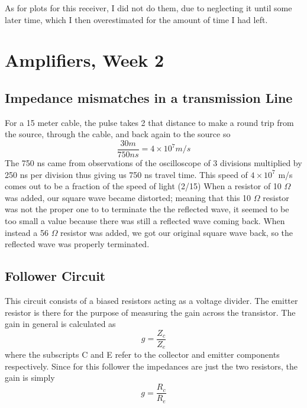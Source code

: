 \documentclass[12 pt]{article}
\begin{document}
As for plots for this receiver, I did not do them, due to neglecting it
until some later time, which I then overestimated for the amount of time I
had left.


\section{Amplifiers, Week 2}

\subsection{Impedance mismatches in a transmission Line}
For a 15 meter cable, the pulse takes 2 that distance to make a round
trip from the source, through the cable, and back again to the source so 
\begin{equation}
  \label{pulse velocity}
  \frac{30 m}{750 ns} = 4\times10^{7} m/s
\end{equation}
The 750 ns came from observations of the oscilloscope of 3 divisions
multiplied by 250 ns per division thus giving us 750 ns travel
time. This speed of $4\times10^{7}$ m/s comes out to be a fraction of
the speed of light (2/15) 
When a resistor of 10 $\Omega$ was added, our square wave became
distorted; meaning that this 10 $\Omega$ resistor was not the proper one
to to terminate the the reflected wave, it seemed to be too small a
value because there was still a reflected wave coming back.
When instead a 56 $\Omega$ resistor was added, we got our original
square wave back, so the reflected wave was properly terminated. 

\subsection{Follower Circuit}
This circuit consists of a biased resistors acting as a voltage
divider. The emitter resistor is there for the purpose of measuring the
gain across the transistor. The gain in general is calculated as 
\begin{equation} 
  \label{gain equation} 
  g = \frac{Z_c}{Z_e}
\end{equation}
where the subscripts C and E refer to the collector and emitter
components respectively. Since for this follower the impedances are just
the two resistors, the gain is simply
\begin{equation}
  \label{gain resistor}
  g = \frac{R_c}{R_e}
\end{equation}
\end{document}
